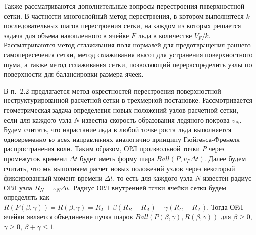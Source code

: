 \documentclass[a4paper,14pt]{extarticle}                     %
\theoremstyle{plain}                                         %
\begin{document}
Также рассматриваются дополнительные вопросы перестроения поверхностной сетки.
В частности многослойный метод перестроения, в котором выполнятеся $k$ последовательных шагов перестроения сетки, на каждом из которых решается задача для объема накопленного в ячейке $F$ льда в количестве $V_F/k$.
Рассматриваются метод сглаживания поля нормалей для предотвращения раннего самопересечения сетки, метод сглаживания высот для устранения поверхностного шума, а также метод сглаживания сетки, позволяющий перераспределить узлы по поверхности для балансировки размера ячеек. 


В п.~2.2 предлагается метод окрестностей перестроения поверхностной неструктурированной расчетной сетки в трехмерной постановке.
Рассмотривается геометрическая задача определения новых положений узлов расчетной сетки, если для каждого узла $N$ известна скорость образования ледяного покрова $v_N$.
Будем считать, что нарастание льда в любой точке роста льда выполняется одновременно во всех направлениях аналогично принципу Гюйгенса-Френеля распространения волн.
Таким образом, ОРЛ произвольной точки $P$ через промежуток времени $\Delta t$ будет иметь форму шара $Ball(P, v_P\Delta t)$.
Далее будем считать, что мы выполняем расчет новых положений узлов через некоторый фиксированный момент времени $\Delta t$, то есть для каждого узла $N$ известен радиус ОРЛ узла $R_N = v_N \Delta t$.
Радиус ОРЛ внутренней точки ячейки сетки будем определять как $R(P(\beta,\gamma)) = R(\beta,\gamma) = R_A + \beta(R_B - R_A) + \gamma(R_C - R_A)$.
Тогда ОРЛ ячейки является объединение пучка шаров $Ball(P(\beta, \gamma), R(\beta, \gamma))$ для $\beta \ge 0$, $\gamma \ge 0$, $\beta + \gamma \le 1$.
\end{document}
